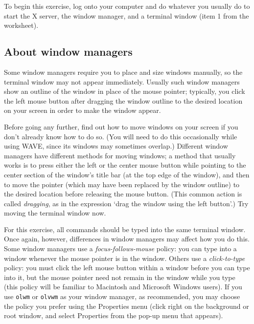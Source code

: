 \documentclass[twoside]{book}
\newcommand{\WAVE}{{\sf WAVE}\xspace}
\begin{document}
To begin this exercise, log onto your computer and do whatever you
usually do to start the X server, the window manager, and a terminal
window (item 1 from the worksheet).

\subsection*{About window managers}

{
\begin{latexonly}
\small
\end{latexonly}
Some window managers require you to place and size windows manually,
so the terminal window may not appear immediately.  Usually such
window managers show an outline of the window in place of the mouse
pointer; typically, you click the left mouse button after dragging the
window outline to the desired location on your screen in order to make
the window appear.

Before going any further, find out how to move windows on your screen
if you don't already know how to do so.  (You will need to do this
occasionally while using \WAVE{}, since its windows may sometimes
overlap.)  Different window managers have different methods for moving
windows; a method that usually works is to press either the left or
the center mouse button while pointing to the center section of the
window's title bar (at the top edge of the window), and then to move
the pointer (which may have been replaced by the window outline) to
the desired location before releasing the mouse button.  (This common
action is called \emph{dragging}, as in the expression `drag the window
using the left button'.)  Try moving the terminal window now.

For this exercise, all commands should be typed into the same terminal
window.  Once again, however, differences in window managers may
affect how you do this.  Some window managers use a
\emph{focus-follows-mouse} policy: you can type into a window whenever
the mouse pointer is in the window.  Others use a \emph{click-to-type}
policy: you must click the left mouse button within a window before
you can type into it, but the mouse pointer need not remain in the
window while you type (this policy will be familiar to Macintosh and
Microsoft Windows users).  If you use {\tt olwm} or {\tt olvwm} as
your window manager, as recommended, you may choose the policy you
prefer using the {\sf Properties} menu (click right on the background
or root window, and select {\sf Properties} from the pop-up menu that
appears).

}
\end{document}

